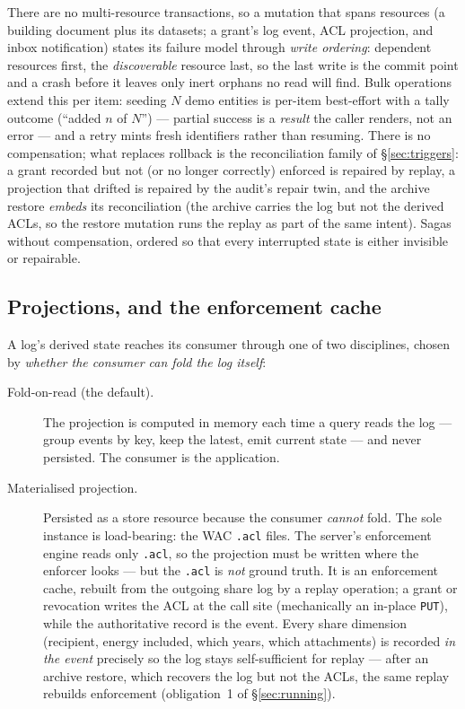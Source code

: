 \documentclass[11pt,a4paper]{article}
\theoremstyle{remark}
\newcommand{\code}[1]{\texttt{#1}}
\begin{document}
There are no multi-resource transactions, so a mutation that spans resources
(a building document plus its datasets; a grant's log event, ACL projection,
and inbox notification) states its failure model through \emph{write
ordering}: dependent resources first, the \emph{discoverable} resource last,
so the last write is the commit point and a crash before it leaves only inert
orphans no read will find. Bulk operations extend this per item: seeding $N$
demo entities is per-item best-effort with a tally outcome
(``added $n$ of $N$'') --- partial success is a \emph{result} the caller
renders, not an error --- and a retry mints fresh identifiers rather than
resuming. There is no compensation; what replaces rollback is the
reconciliation family of \S\ref{sec:triggers}: a grant recorded but not (or
no longer correctly) enforced is repaired by replay, a projection that drifted
is repaired by the audit's repair twin, and the archive restore \emph{embeds}
its reconciliation (the archive carries the log but not the derived ACLs, so
the restore mutation runs the replay as part of the same intent). Sagas
without compensation, ordered so that every interrupted state is either
invisible or repairable.

\subsection{Projections, and the enforcement cache}\label{sec:projections}

A log's derived state reaches its consumer through one of two disciplines, chosen
by \emph{whether the consumer can fold the log itself}:

\begin{description}
\item[Fold-on-read (the default).] The projection is computed in memory each
  time a query reads the log --- group events by key, keep the latest, emit
  current state --- and never persisted. The consumer is the application.
\item[Materialised projection.] Persisted as a store resource because the
  consumer \emph{cannot} fold. The sole instance is load-bearing: the WAC
  \code{.acl} files. The server's enforcement engine reads only \code{.acl}, so
  the projection must be written where the enforcer looks --- but the \code{.acl}
  is \emph{not} ground truth. It is an enforcement cache, rebuilt from the
  outgoing share log by a replay operation; a grant or revocation writes the ACL
  at the call site (mechanically an in-place \code{PUT}), while the authoritative
  record is the event. Every share dimension (recipient, energy included, which
  years, which attachments) is recorded \emph{in the event} precisely so the log
  stays self-sufficient for replay --- after an archive restore, which recovers
  the log but not the ACLs, the same replay rebuilds enforcement
  (obligation~1 of \S\ref{sec:running}).
\end{description}
\end{document}
